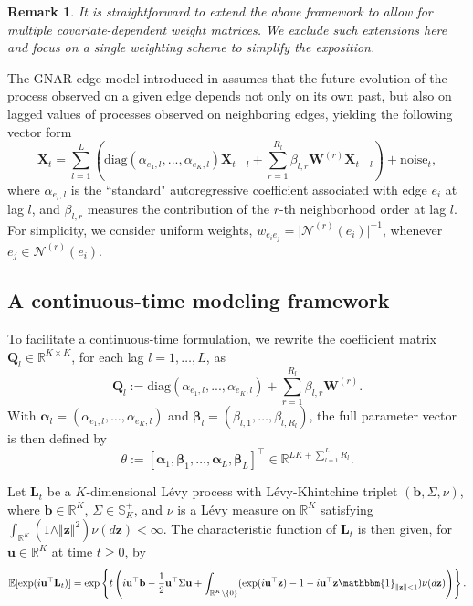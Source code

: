 \documentclass[12pt]{amsart}
\newtheorem{remark}{Remark}[section]
\numberwithin{equation}{section}
\newcommand{\R}{\mathbb{R}}
\newcommand{\E}{\mathbb{E}}
\newcommand{\1}{\mathbf{1}}
\begin{document}
\begin{remark}
It is straightforward to extend the above framework to allow for multiple covariate-dependent weight matrices. We exclude such extensions here and focus on a single weighting scheme to simplify the exposition.
\end{remark}

The GNAR edge model introduced in \cite{mantziou2023gnar} assumes that the future evolution of the process observed on a given edge depends not only on its own past, but also on lagged values of processes observed on neighboring edges, yielding the following vector form
\begin{equation*}
   \mathbf{X}_t = \sum_{l=1}^L\left(\text{diag}(\alpha_{e_1,l},...,\alpha_{e_K,l})\mathbf{X}_{t-l} + \sum_{r=1}^{R_l}\beta_{l,r}\mathbf{W}^{(r)}\mathbf{X}_{t-l}\right)+\mathrm{noise}_t,
\end{equation*}
where $\alpha_{e_i,l}$ is the ``standard" autoregressive coefficient associated with edge $e_i$ at lag $l$, and $\beta_{l,r}$ measures the contribution of the $r$-th neighborhood order at lag $l$. For simplicity, we consider uniform weights, $w_{e_ie_j}=\vert \mathcal{N}^{(r)}(e_i)\vert^{-1}$, whenever $e_j\in\mathcal{N}^{(r)}(e_i)$.

\subsection{A continuous-time modeling framework}
To facilitate a continuous-time formulation, we rewrite the coefficient matrix $\mathbf{Q}_l \in \mathbb{R}^{K \times K}$, for each lag $l = 1,\dots,L$, as
\begin{equation*}
\mathbf{Q}_l := \text{diag}(\alpha_{e_1,l},...,\alpha_{e_K,l})+ \sum_{r=1}^{R_l}\beta_{l,r}\textbf{W}^{(r)}. 
\end{equation*}
With $\bm{\alpha}_l=(\alpha_{e_1,l},\dots,\alpha_{e_K,l})$ and $\bm{\beta}_l = (\beta_{l,1},\dots,\beta_{l,R_l})$, the full parameter vector is then defined by
\begin{equation}
\label{theta}
    \theta := [\bm{\alpha}_1,\bm{\beta}_1,\dots,\bm{\alpha}_L,\bm{\beta}_L]^{\top}\in\R^{LK+ \sum_{l=1}^LR_l}.
\end{equation}

Let $\mathbf{L}_t$ be a $K$-dimensional L\'evy process with L\'evy-Khintchine triplet $(\mathbf{b},\Sigma, \nu)$, where $\mathbf{b}\in\R^K$, $\Sigma\in\mathbb{S}^{+}_K$, and $\nu$ is a L\'evy measure on $\R^K$ satisfying $\int_{\R^K}(1\wedge\Vert\mathbf{z}\Vert^2)\nu(d\mathbf{z})<\infty$. The characteristic function of $\mathbf{L}_t$ is then given, for $\mathbf{u}\in\R^K$ at time $t\geq 0$, by
\begin{equation*}
\E[\exp(i\mathbf{u}^{\top}\mathbf{L}_t)]=\exp\left\lbrace t\left(i\mathbf{u}^{\top}\mathbf{b}-\frac{1}{2}\mathbf{u}^{\top}\Sigma\mathbf{u}+\int_{\R^K\setminus\{0\}}(\exp(i\mathbf{u}^{\top}\mathbf{z})-1-i\mathbf{u}^{\top}\mathbf{z}\mathbbm{1}_{\Vert\mathbf{z}\Vert<1})\nu(d\mathbf{z})\right)\right\rbrace.
\end{equation*}
\end{document}
